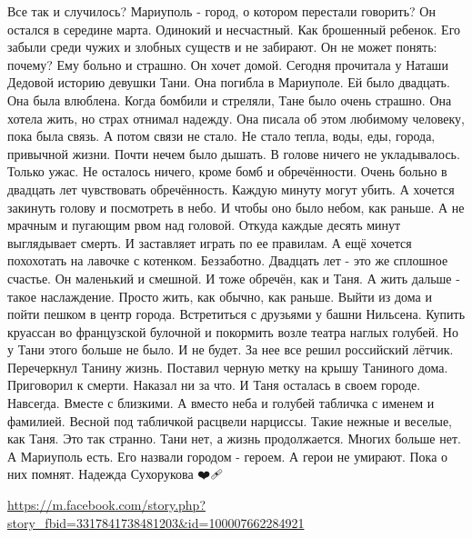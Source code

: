 \obeycr
Все так и случилось? 
Мариуполь - город, о котором перестали говорить?
Он остался в середине марта. 
Одинокий и несчастный. 
Как брошенный ребенок. 
Его забыли среди чужих и злобных существ и не забирают.
Он не может понять: почему? 
Ему больно и страшно. 
Он хочет домой. 
Сегодня прочитала у Наташи Дедовой историю девушки Тани. 
Она погибла в Мариуполе. 
Ей было двадцать. 
Она была влюблена. 
Когда бомбили и стреляли, Тане было очень страшно. 
Она хотела жить, но страх отнимал надежду. 
Она писала об этом любимому человеку, пока была связь. 
А потом связи не стало. 
Не стало тепла, воды, еды, города, привычной жизни. 
Почти нечем было дышать. 
В голове ничего не укладывалось. 
Только ужас. 
Не осталось ничего, кроме бомб и обречённости. 
Очень больно в двадцать лет чувствовать обречённость. 
Каждую минуту могут убить. 
А хочется закинуть голову и посмотреть в небо. 
И чтобы оно было небом, как раньше. 
А не мрачным и пугающим рвом над головой. 
Откуда каждые десять минут выглядывает смерть. 
И заставляет играть по ее правилам.
А ещё хочется похохотать на лавочке с котенком.
Беззаботно. 
Двадцать лет - это же сплошное счастье. 
Он маленький и смешной. 
И тоже обречён, как и Таня. 
А жить дальше - такое наслаждение. 
Просто жить, как обычно, как раньше. 
Выйти из дома и пойти пешком в центр города. 
Встретиться с друзьями у башни Нильсена. 
Купить круассан во французской булочной и покормить возле театра наглых голубей. 
Но у Тани этого больше не было. 
И не будет. 
За нее все решил российский лётчик. 
Перечеркнул Танину жизнь. 
Поставил черную метку на  крышу Таниного дома. 
Приговорил к смерти. 
Наказал ни за что. 
И Таня осталась в своем городе.
Навсегда.  
Вместе с близкими. 
А  вместо неба и голубей табличка с именем  и фамилией.  
Весной под табличкой расцвели нарциссы. 
Такие нежные и веселые, как Таня. 
Это так странно. 
Тани нет, а жизнь продолжается. 
Многих больше нет.
А Мариуполь есть. 
Его назвали городом - героем. 
А герои не умирают. 
Пока о них помнят.
Надежда Сухорукова ❤️🩹
\restorecr

\url{https://m.facebook.com/story.php?story_fbid=3317841738481203&id=100007662284921}
